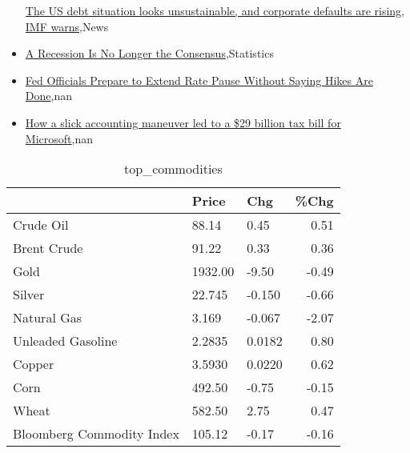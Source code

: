 \documentclass{article}%
\begin{document}
\begin{itemize}
\href{https://reddit.com/r/Economics/comments/178orut/the\_us\_debt\_situation\_looks\_unsustainable\_and/}{The US debt situation looks unsustainable, and corporate defaults are rising, IMF warns},News%
\item%
\href{https://reddit.com/r/Economics/comments/178n9vf/a\_recession\_is\_no\_longer\_the\_consensus/}{A Recession Is No Longer the Consensus},Statistics%
\item%
\href{https://reddit.com/r/Economics/comments/178ko39/fed\_officials\_prepare\_to\_extend\_rate\_pause/}{Fed Officials Prepare to Extend Rate Pause Without Saying Hikes Are Done},nan%
\item%
\href{https://reddit.com/r/Economics/comments/178klvr/how\_a\_slick\_accounting\_maneuver\_led\_to\_a\_29/}{How a slick accounting maneuver led to a \$29 billion tax bill for Microsoft},nan%
\end{itemize}%


\begin{table}[htbp]%
\caption{top\_commodities}%
\centering%
\begin{adjustbox}{width=1\textwidth}%
\begin{tabular}{lllr}
\toprule
                          &   Price &    Chg &  \%Chg \\
\midrule
               Crude Oil  &   88.14 &   0.45 &  0.51 \\
             Brent Crude  &   91.22 &   0.33 &  0.36 \\
                    Gold  & 1932.00 &  -9.50 & -0.49 \\
                  Silver  &  22.745 & -0.150 & -0.66 \\
             Natural Gas  &   3.169 & -0.067 & -2.07 \\
       Unleaded Gasoline  &  2.2835 & 0.0182 &  0.80 \\
                  Copper  &  3.5930 & 0.0220 &  0.62 \\
                    Corn  &  492.50 &  -0.75 & -0.15 \\
                   Wheat  &  582.50 &   2.75 &  0.47 \\
Bloomberg Commodity Index &  105.12 &  -0.17 & -0.16 \\
\bottomrule
\end{tabular}
%
\end{adjustbox}%
\end{table}

%
\end{document}
